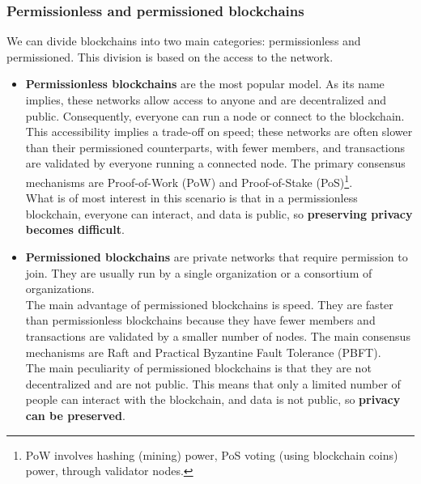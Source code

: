 \subsubsection{Permissionless and permissioned blockchains}
\label{subsubsec:comparison}
We can divide blockchains into two main categories: permissionless and permissioned.
This division is based on the access to the network.
\begin{itemize}
    \item \textbf{Permissionless blockchains} are the most popular model. As its name implies, these 
    networks allow access to anyone and are decentralized and public. Consequently, 
    everyone can run a node or connect to the blockchain.\\
    This accessibility implies a trade-off on speed; these networks are often slower than 
    their permissioned counterparts, with fewer members, and transactions are validated by 
    everyone running a connected node. The primary consensus mechanisms are Proof-of-Work 
    (PoW) and Proof-of-Stake (PoS)\footnote{PoW involves hashing (mining) power, PoS voting 
    (using blockchain coins) power, through validator nodes.}.\\
    What is of most interest in this scenario is that in a permissionless blockchain, 
    everyone can interact, and data is public, so \textbf{preserving privacy becomes difficult}.
    \item \textbf{Permissioned blockchains} are private networks that require permission to
    join. They are usually run by a single organization or a consortium of organizations.\\
    The main advantage of permissioned blockchains is speed. They are faster than
    permissionless blockchains because they have fewer members and transactions are
    validated by a smaller number of nodes. The main consensus mechanisms are Raft and 
    Practical Byzantine Fault Tolerance (PBFT).\\
    The main peculiarity of permissioned blockchains is that they are not decentralized
    and are not public. This means that only a limited number of people can interact with
    the blockchain, and data is not public, so \textbf{privacy can be preserved}.
\end{itemize}

